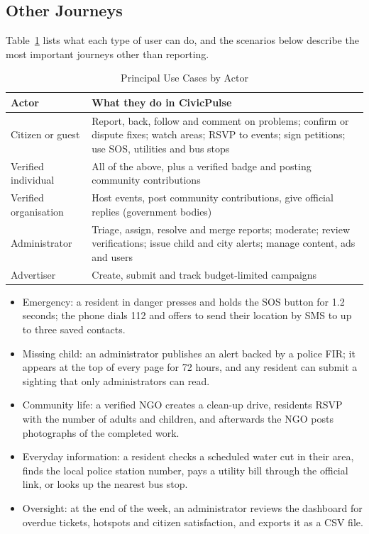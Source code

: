 \documentclass[conference]{IEEEtran}
\begin{document}
\subsection{Other Journeys}
Table~\ref{tab:1} lists what each type of user can do, and the scenarios below describe the most important journeys other than reporting.

\begin{table}[htbp]
\caption{Principal Use Cases by Actor}
\label{tab:1}
\begin{center}
\footnotesize
\begin{tabular}{|>{\raggedright\arraybackslash}p{}|>{\raggedright\arraybackslash}p{}|}
\hline
\textbf{Actor} & \textbf{What they do in CivicPulse} \\
\hline
Citizen or guest & Report, back, follow and comment on problems; confirm or dispute fixes; watch areas; RSVP to events; sign petitions; use SOS, utilities and bus stops \\ \hline
Verified individual & All of the above, plus a verified badge and posting community contributions \\ \hline
Verified organisation & Host events, post community contributions, give official replies (government bodies) \\ \hline
Administrator & Triage, assign, resolve and merge reports; moderate; review verifications; issue child and city alerts; manage content, ads and users \\ \hline
Advertiser & Create, submit and track budget-limited campaigns \\ \hline
\end{tabular}
\end{center}
\end{table}
\begin{itemize}
\item Emergency: a resident in danger presses and holds the SOS button for 1.2 seconds; the phone dials 112 and offers to send their location by SMS to up to three saved contacts.
\item Missing child: an administrator publishes an alert backed by a police FIR; it appears at the top of every page for 72 hours, and any resident can submit a sighting that only administrators can read.
\item Community life: a verified NGO creates a clean-up drive, residents RSVP with the number of adults and children, and afterwards the NGO posts photographs of the completed work.
\item Everyday information: a resident checks a scheduled water cut in their area, finds the local police station number, pays a utility bill through the official link, or looks up the nearest bus stop.
\item Oversight: at the end of the week, an administrator reviews the dashboard for overdue tickets, hotspots and citizen satisfaction, and exports it as a CSV file.
\end{itemize}
\end{document}
